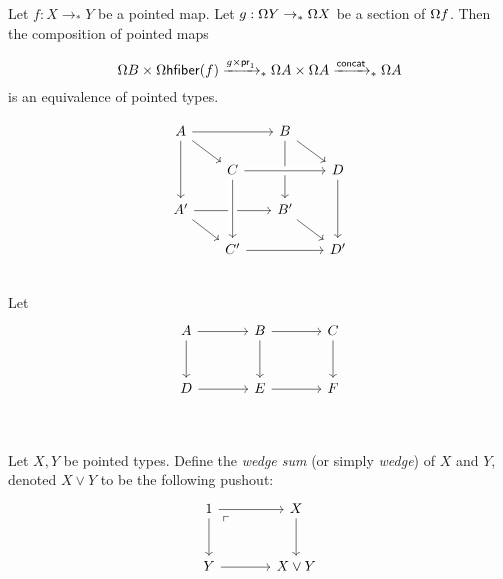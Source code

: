 

\begin{lemma}
    Let $f : X \to_* Y$ be a pointed map. Let $g : \Omega Y \to_* \Omega X$ be a section of $\Omega f$. Then the composition of pointed maps
    
    \begin{equation*}
        \Omega B \times \Omega \mathsf{hfiber}(f) \xrightarrow{g \times \mathsf{pr}_1}_*
            \Omega A \times \Omega A \xrightarrow{\mathsf{concat}}_* \Omega A    
    \end{equation*}
    is an equivalence of pointed types.

\end{lemma}


\begin{theorem}[Descent]
    \begin{equation*}
        \begin{tikzcd}[row sep=scriptsize, column sep=scriptsize]
            A \ar[dr] \ar[rr] \ar[dd] & & B \ar[dr] \ar[dd] \\
            & C \ar[rr, crossing over] & & D \ar[dd] \\
            A' \ar[dr] \ar[rr] & & B' \ar[dr] \\
            & C' \ar[rr] \ar[from=uu, crossing over] & & D' \\
        \end{tikzcd}
    \end{equation*}

\end{theorem}


\begin{lemma}
    Let 
    \begin{equation*}
        \begin{tikzcd}[row sep=large, column sep=large]
            A \ar[r] \ar[d] & B \ar[r] \ar[d] & C \ar[d] \\
            D \ar[r] & E \ar[r] & F \\
        \end{tikzcd}
    \end{equation*}
\end{lemma}

\begin{defin}
    Let $X, Y$ be pointed types. Define the \emph{wedge sum} (or simply \emph{wedge}) of $X$ and $Y$, denoted $X \vee Y$ to be the following pushout:
    \begin{equation*}
        \begin{tikzcd}[row sep=large, column sep=large]
            1 \ar[r] \ar[d] \ar[dr, phantom, "\ulcorner", very near start] & X \ar[d] \\
            Y \ar[r] & X \vee Y
        \end{tikzcd}
    \end{equation*}
\end{defin}

